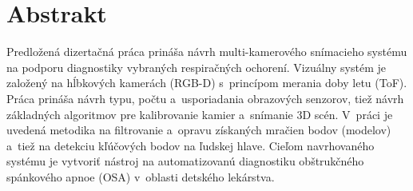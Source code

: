 
\chapter*{Abstrakt} \label{kap:Abstrakt}

Predložená dizertačná práca prináša návrh multi-kamerového snímacieho systému na podporu diagnostiky vybraných respiračných ochorení. Vizuálny systém je založený na hĺbkových kamerách (RGB-D) s princípom merania doby letu (ToF). Práca prináša návrh typu, počtu a usporiadania obrazových senzorov, tiež návrh základných algoritmov pre kalibrovanie kamier a snímanie 3D scén. V práci je uvedená metodika na filtrovanie a opravu získaných mračien bodov (modelov) a tiež na detekciu kľúčových bodov na ľudskej hlave. Cieľom navrhovaného systému je vytvoriť nástroj na automatizovanú diagnostiku obštrukčného spánkového apnoe (OSA) v oblasti detského lekárstva.
